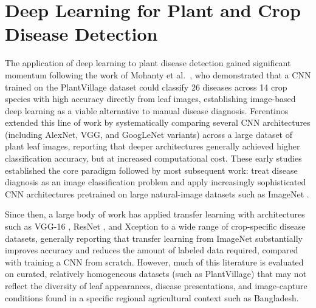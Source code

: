 \documentclass[12pt,a4paper,oneside]{report}
\begin{document}
\section{Deep Learning for Plant and Crop Disease Detection}
The application of deep learning to plant disease detection gained significant momentum following the work of
Mohanty et al.~\cite{mohanty2016}, who demonstrated that a CNN trained on the PlantVillage dataset could classify
26 diseases across 14 crop species with high accuracy directly from leaf images, establishing image-based deep
learning as a viable alternative to manual disease diagnosis. Ferentinos~\cite{ferentinos2018} extended this line
of work by systematically comparing several CNN architectures (including AlexNet, VGG, and GoogLeNet variants)
across a large dataset of plant leaf images, reporting that deeper architectures generally achieved higher
classification accuracy, but at increased computational cost. These early studies established the core paradigm
followed by most subsequent work: treat disease diagnosis as an image classification problem and apply
increasingly sophisticated CNN architectures pretrained on large natural-image datasets such as ImageNet
\cite{deng2009imagenet}.

Since then, a large body of work has applied transfer learning with architectures such as VGG-16
\cite{simonyan2014vgg}, ResNet \cite{he2016resnet}, and Xception \cite{chollet2017xception} to a wide range of
crop-specific disease datasets, generally reporting that transfer learning from ImageNet substantially improves
accuracy and reduces the amount of labeled data required, compared with training a CNN from scratch. However,
much of this literature is evaluated on curated, relatively homogeneous datasets (such as PlantVillage) that may
not reflect the diversity of leaf appearances, disease presentations, and image-capture conditions found in a
specific regional agricultural context such as Bangladesh.
\end{document}
